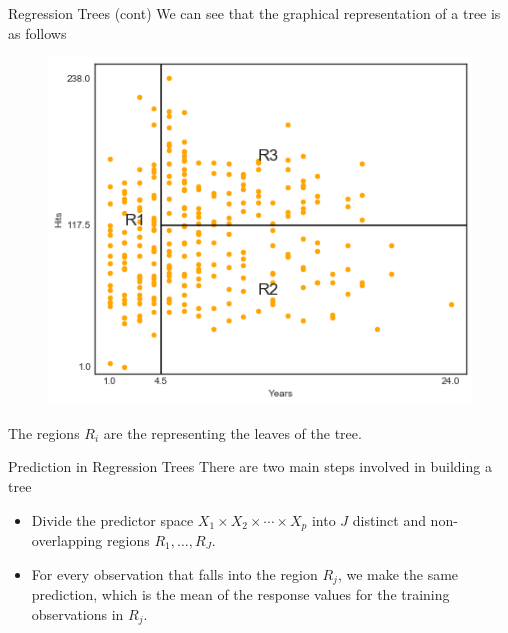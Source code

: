 \documentclass{beamer}
\begin{document}
\begin{frame}{Regression Trees (cont)}
	We can see that the graphical representation of a tree is as follows
	
	\begin{figure}[h]
		\centering
		\includegraphics[scale=0.5]{../../Figures/fig_hitters_graph.png}
	\end{figure}
The regions $R_i$ are the representing the leaves of the tree.  	
	
\end{frame}

\begin{frame}{Prediction in Regression Trees}
	There are two main steps involved in building a tree
	
	\begin{itemize}
		\item Divide the predictor space $X_1 \times X_2 \times \cdots \times X_p$ into $J$ distinct and non-overlapping regions $R_1,\ldots, R_J$.
		\item For every observation that falls into the region $R_j$, we make the same prediction, which is the mean of the response values for the training observations in $R_j$.
	\end{itemize}
\end{frame}
\end{document}
